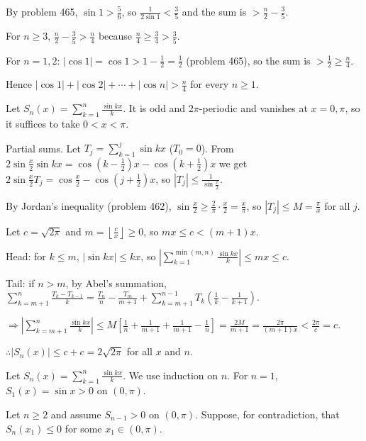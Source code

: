   By problem 465, $\sin1 > \frac{5}{6}$, so $\frac{1}{2\sin1} < \frac{3}{5}$ and the sum is $>\frac{n}{2}
  - \frac{3}{5}$.

  For $n\geq 3$, $\frac{n}{2} - \frac{3}{5} > \frac{n}{4}$ because $\frac{n}{4}\geq\frac{3}{4} >
  \frac{3}{5}$.

  For $n = 1, 2$: $|\cos1| = \cos1 > 1 - \frac{1}{2} = \frac{1}{2}$ (problem 465), so the sum is $>\frac{1}{2}\geq
  \frac{n}{4}$.

  Hence $|\cos1| + |\cos2| + \cdots + |\cos n| > \frac{n}{4}$ for every $n\geq 1$.
\item Let $S_n(x) = \displaystyle\sum_{k = 1}^n\frac{\sin kx}{k}$. It is odd and $2\pi$-periodic and
  vanishes at $x = 0, \pi$, so it suffices to take $0 < x < \pi$.

  Partial sums. Let $T_j = \displaystyle\sum_{k = 1}^j\sin kx$ ($T_0 = 0$). From $2\sin\frac{x}{2}\sin kx
  = \cos\left(k - \frac{1}{2}\right)x - \cos\left(k + \frac{1}{2}\right)x$ we get $2\sin\frac{x}{2}T_j
  = \cos\frac{x}{2} - \cos\left(j + \frac{1}{2}\right)x$, so $|T_j|\leq\frac{1}{\sin\frac{x}{2}}$.

  By Jordan's inequality (problem 462), $\sin\frac{x}{2}\geq\frac{2}{\pi}\cdot\frac{x}{2} = \frac{x}{\pi}$, so
  $|T_j|\leq M = \frac{\pi}{x}$ for all $j$.

  Let $c = \sqrt{2\pi}$ and $m = \left\lfloor\frac{c}{x}\right\rfloor\geq 0$, so $mx\leq c < (m + 1)x$.

  Head: for $k\leq m$, $|\sin kx|\leq kx$, so $\left|\displaystyle\sum_{k = 1}^{\min(m, n)}\frac{\sin
      kx}{k}\right|\leq mx\leq c$.

  Tail: if $n > m$, by Abel's summation, $\displaystyle\sum_{k = m + 1}^n\frac{T_k - T_{k - 1}}{k}
  = \frac{T_n}{n} - \frac{T_m}{m + 1} + \sum_{k = m + 1}^{n - 1}T_k\left(\frac{1}{k} - \frac{1}{k +
      1}\right)$.

  $\Rightarrow\left|\displaystyle\sum_{k = m + 1}^n\frac{\sin kx}{k}\right|\leq M\left[\frac{1}{n}
  + \frac{1}{m + 1} + \frac{1}{m + 1} - \frac{1}{n}\right] = \frac{2M}{m + 1} = \frac{2\pi}{(m + 1)x} <
  \frac{2\pi}{c} = c$.

  $\therefore|S_n(x)|\leq c + c = 2\sqrt{2\pi}$ for all $x$ and $n$.
\item Let $S_n(x) = \displaystyle\sum_{k = 1}^n\frac{\sin kx}{k}$. We use induction on $n$. For $n = 1$,
  $S_1(x) = \sin x > 0$ on $(0, \pi)$.

  Let $n\geq 2$ and assume $S_{n - 1} > 0$ on $(0, \pi)$. Suppose, for contradiction, that $S_n(x_1)\leq 0$
  for some $x_1\in(0, \pi)$.

